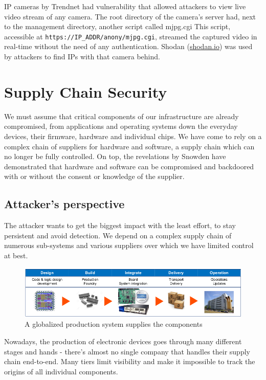 \documentclass[11pt,oneside,a4paper]{article}
\begin{document}
IP cameras by Trendnet had vulnerability that allowed attackers to view live video stream of any camera. The root directory of the camera’s server had, next to the management directory, another script called mjpg.cgi This script, accessible at \texttt{https://IP\_ADDR/anony/mjpg.cgi}, streamed the captured video in real-time without the need of any authentication. Shodan (\href{https://www.shodan.io/}{shodan.io}) was used by attackers to find IPs with that camera behind.

\section{Supply Chain Security}

We must assume that critical components of our infrastructure are already compromised, from applications and operating systems down the everyday devices, their firmware, hardware and individual chips. We have come to rely on a complex chain of suppliers for hardware and software, a supply chain which can no longer be fully controlled. On top, the revelations by Snowden have demonstrated that hardware and software can be compromised and backdoored with or without the consent or knowledge of the supplier.\\


\subsection{Attacker's perspective}

The attacker wants to get the biggest impact with the least effort, to stay persistent and avoid detection. We depend on a complex supply chain of numerous sub-systems and various suppliers over which we have limited control at best.

\begin{figure}[hb]
	\centering
	\includegraphics[width=0.7\linewidth]{figures/supply_chain}
	\caption{A globalized production system supplies the components}
	\label{fig:supplychain}
\end{figure}

Nowadays, the production of electronic devices goes through many different stages and hands - there's almost no single company that handles their supply chain end-to-end. Many tiers limit visibility and make it impossible to track the origins of all individual components.
\end{document}
